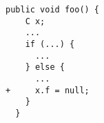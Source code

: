 \begin{lstlisting}[frame=single]
  public void foo() {
    C x;
    ...
    if (...) {
      ...
    } else {
      ...
+     x.f = null;
    }
  }
\end{lstlisting}
